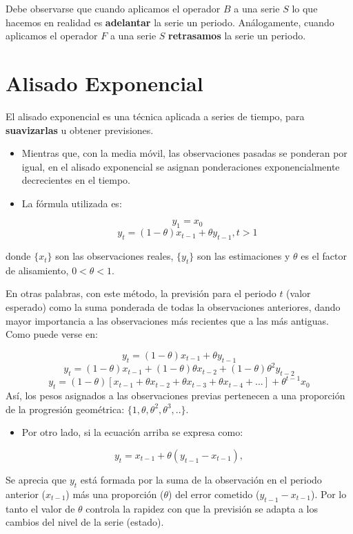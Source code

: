 \documentclass[]{book}
\providecommand{\tightlist}{%
  \setlength{\itemsep}{0pt}\setlength{\parskip}{0pt}}
\begin{document}
Debe observarse que cuando aplicamos el operador \(B\) a una serie \(S\) lo que hacemos en realidad es \textbf{adelantar} la serie un periodo. Análogamente, cuando aplicamos el operador \(F\) a una serie \(S\) \textbf{retrasamos} la serie un periodo.

\hypertarget{alisado-exponencial}{%
\section{Alisado Exponencial}\label{alisado-exponencial}}

El alisado exponencial es una técnica aplicada a series de tiempo, para \textbf{suavizarlas} u obtener previsiones.

\begin{itemize}
\item
  Mientras que, con la media móvil, las observaciones pasadas se ponderan por igual, en el alisado exponencial se asignan ponderaciones exponencialmente decrecientes en el tiempo.
\item
  La fórmula utilizada es:

  \[ y_1 = x_0  \]
  \[ y_t = (1-\theta)x_{t-1}+\theta y_{t-1},  t > 1 \]
\end{itemize}

donde \(\{x_t\}\) son las observaciones reales, \(\{y_t\}\) son las estimaciones y \(\theta\) es el factor de alisamiento, \(0 < \theta < 1\).

En otras palabras, con este método, la previsión para el periodo \(t\) (valor esperado) como la suma ponderada de todas la observaciones anteriores, dando mayor importancia a las observaciones más recientes que a las más antiguas. Como puede verse en:

\[ y_t = (1-\theta) x_{t-1} +\theta y_{t-1} \]
\[ y_t = (1-\theta)x_{t-1}+(1-\theta)\theta x_{t-2}+(1-\theta) \theta^2 y_{t-2} \]
\[ y_t = (1-\theta)[x_{t-1}+\theta x_{t-2}+\theta x_{t-3}+\theta x_{t-4}+ ...] + \theta^{t-1} x_0 \]
Así, los pesos asignados a las observaciones previas pertenecen a una proporción de la progresión geométrica: \(\{1, \theta, \theta^2, \theta^3, ..\}\).

\begin{itemize}
\tightlist
\item
  Por otro lado, si la ecuación arriba se expresa como:
\end{itemize}

\[
                y_t = x_{t-1} + \theta(y_{t-1} - x_{t-1}) ,  
\]

Se aprecia que \(y_t\) está formada por la suma de la observación en el periodo anterior (\(x_{t-1}\)) más una proporción (\(\theta\)) del error cometido (\(y_{t-1} - x_{t-1}\)). Por lo tanto el valor de \(\theta\) controla la rapidez con que la previsión se adapta a los cambios del nivel de la serie (estado).
\end{document}

